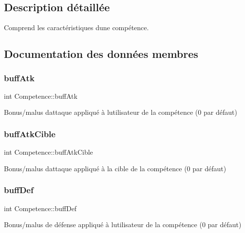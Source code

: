 \subsection{Description détaillée}
Comprend les caractéristiques d\textquotesingle{}une compétence. 

\subsection{Documentation des données membres}
\mbox{\label{structCompetence_ab73f7a437c97be5e93f0f705c529fd3f}} 
\subsubsection{\texorpdfstring{buff\+Atk}{buffAtk}}
{\footnotesize\ttfamily int Competence\+::buff\+Atk}

Bonus/malus d\textquotesingle{}attaque appliqué à l\textquotesingle{}utilisateur de la compétence (0 par défaut) \mbox{\label{structCompetence_afac4c1ff400719d46a481136ddbb147e}} 
\subsubsection{\texorpdfstring{buff\+Atk\+Cible}{buffAtkCible}}
{\footnotesize\ttfamily int Competence\+::buff\+Atk\+Cible}

Bonus/malus d\textquotesingle{}attaque appliqué à la cible de la compétence (0 par défaut) \mbox{\label{structCompetence_a5a44f07282d561c3a4205e92529498e2}} 
\subsubsection{\texorpdfstring{buff\+Def}{buffDef}}
{\footnotesize\ttfamily int Competence\+::buff\+Def}

Bonus/malus de défense appliqué à l\textquotesingle{}utilisateur de la compétence (0 par défaut) \mbox{\label{structCompetence_a05a04fab2d82188e07d7df7c4033895e}} 
